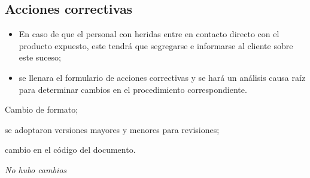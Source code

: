 \subsection{Acciones correctivas}
\begin{itemize}
	\item En caso de que el personal con heridas entre en contacto directo con el producto expuesto, este tendrá que segregarse e informarse al cliente sobre este suceso;
	\item se llenara el formulario de acciones correctivas y se hará un análisis causa raíz para determinar cambios en el procedimiento correspondiente.
\end{itemize}

\begin{changelog}[simple, sectioncmd=\subsection*,label=changelog-\thesection-\MayorVer.\MenorVer]
	\begin{version}[v=2.1, date=2023--01, author=Pablo E. Alanis]
			\item Cambio de formato;
			\item se adoptaron versiones mayores y menores para revisiones;
			\item cambio en el código del documento.
	\end{version}

	\begin{version}[v=1.8, date=2022--05, author=Alonso M.]
		\item \textit{No hubo cambios}
	\end{version}
\end{changelog}